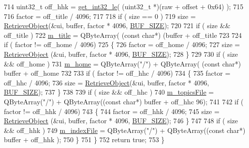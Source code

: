 \begin{DoxyCode}
714             uint32\_t off\_hhk = \hyperlink{bitfiddle_8h_aa84a55d4947b4ac2b8a52032cbaadd59}{get\_int32\_le}( (uint32\_t *)(raw + offset + 0x64) );
715 
716             factor = off\_title / 4096;
717 
718             \textcolor{keywordflow}{if} ( size == 0 ) 
719                 size = \hyperlink{classLCHMFileImpl_a8535dce5eb8f22161ecf3510fde8aa4e}{RetrieveObject}(&ui, buffer, factor * 4096, 
      \hyperlink{libchmfileimpl_8cpp_a6821bafc3c88dfb2e433a095df9940c6}{BUF\_SIZE});
720 
721             \textcolor{keywordflow}{if} ( size && off\_title )
722                 \hyperlink{classLCHMFileImpl_abe88f8991855d7d573bd2966f9fd9f8b}{m\_title} = QByteArray( (\textcolor{keyword}{const} \textcolor{keywordtype}{char}*) (buffer + off\_title %
723 
724             \textcolor{keywordflow}{if} ( factor != off\_home / 4096)
725             \{
726                 factor = off\_home / 4096;       
727                 size = \hyperlink{classLCHMFileImpl_a8535dce5eb8f22161ecf3510fde8aa4e}{RetrieveObject} (&ui, buffer, factor * 4096, 
      \hyperlink{libchmfileimpl_8cpp_a6821bafc3c88dfb2e433a095df9940c6}{BUF\_SIZE});
728             \}
729             
730             \textcolor{keywordflow}{if} ( size && off\_home )
731                 \hyperlink{classLCHMFileImpl_a5bf6157ef7d4bc446c389eea871c09a0}{m\_home} = QByteArray(\textcolor{stringliteral}{"/"}) + QByteArray( (\textcolor{keyword}{const} \textcolor{keywordtype}{char}*) buffer + off\_home %
732 
733             \textcolor{keywordflow}{if} ( factor != off\_hhc / 4096)
734             \{
735                 factor = off\_hhc / 4096;
736                 size = \hyperlink{classLCHMFileImpl_a8535dce5eb8f22161ecf3510fde8aa4e}{RetrieveObject}(&ui, buffer, factor * 4096, 
      \hyperlink{libchmfileimpl_8cpp_a6821bafc3c88dfb2e433a095df9940c6}{BUF\_SIZE});
737             \}
738         
739             \textcolor{keywordflow}{if} ( size && off\_hhc )
740                 \hyperlink{classLCHMFileImpl_af3d33a88f44e3d103f08d9cc1c0ccf12}{m\_topicsFile} = QByteArray(\textcolor{stringliteral}{"/"}) + QByteArray((\textcolor{keyword}{const} \textcolor{keywordtype}{char}*) buffer + off\_hhc %
      96);
741 
742             \textcolor{keywordflow}{if} ( factor != off\_hhk / 4096)
743             \{
744                 factor = off\_hhk / 4096;
745                 size = \hyperlink{classLCHMFileImpl_a8535dce5eb8f22161ecf3510fde8aa4e}{RetrieveObject} (&ui, buffer, factor * 4096, 
      \hyperlink{libchmfileimpl_8cpp_a6821bafc3c88dfb2e433a095df9940c6}{BUF\_SIZE});
746             \}
747 
748             \textcolor{keywordflow}{if} ( size && off\_hhk )
749                 \hyperlink{classLCHMFileImpl_ab5f59c7a474b444bb07a1992bd0a6d82}{m\_indexFile} = QByteArray(\textcolor{stringliteral}{"/"}) + QByteArray((\textcolor{keyword}{const} \textcolor{keywordtype}{char}*) buffer + off\_hhk %
      );
750         \}
751     \}
752     \textcolor{keywordflow}{return} \textcolor{keyword}{true};
753 \}
\end{DoxyCode}
